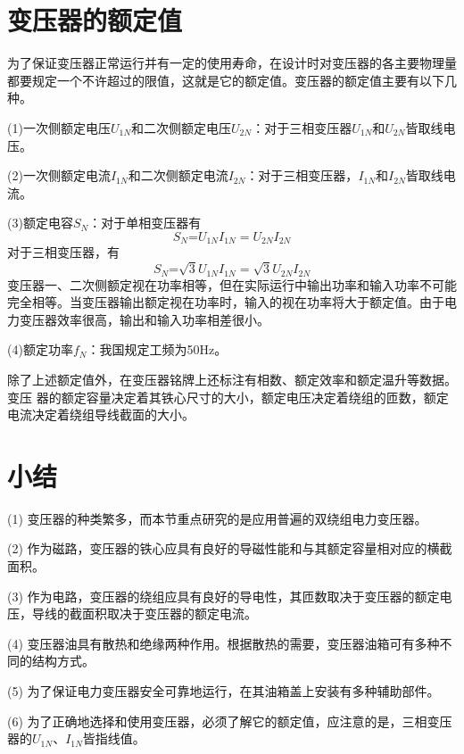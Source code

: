 \documentclass{book}
\begin{document}
\section{变压器的额定值}
为了保证变压器正常运行并有一定的使用寿命，在设计时对变压器的各主要物理量都要规定一个不许超过的限值，这就是它的额定值。变压器的额定值主要有以下几种。

(1)一次侧额定电压${{U}_{1N}}$和二次侧额定电压${{U}_{2N}}$：对于三相变压器${{U}_{1N}}$和${{U}_{2N}}$皆取线电压。

(2)一次侧额定电流${{I}_{1N}}$和二次侧额定电流${{I}_{2N}}$：对于三相变压器，${{I}_{1N}}$和${{I}_{2N}}$皆取线电流。

(3)额定电容${{S}_{N}}$：对于单相变压器有
\begin{equation}
{{S}_{N}}\text{=}{{U}_{1N}}{{I}_{1N}}={{U}_{2N}}{{I}_{2N}}
\label{1-1}
\end{equation}
对于三相变压器，有
\begin{equation}
{{S}_{N}}\text{=}\sqrt{3}{{U}_{1N}}{{I}_{1N}}=\sqrt{3}{{U}_{2N}}{{I}_{2N}}
\label{1-2}
\end{equation}
变压器一、二次侧额定视在功率相等，但在实际运行中输出功率和输入功率不可能完全相等。当变压器输出额定视在功率时，输入的视在功率将大于额定值。由于电力变压器效率很高，输出和输入功率相差很小。

(4)额定功率${{f}_{N}}$：我国规定工频为50Hz。

除了上述额定值外，在变压器铭牌上还标注有相数、额定效率和额定温升等数据。变压 器的额定容量决定着其铁心尺寸的大小，额定电压决定着绕组的匝数，额定电流决定着绕组导线截面的大小。

\section{小结}
(1) 变压器的种类繁多，而本节重点研究的是应用普遍的双绕组电力变压器。

(2) 作为磁路，变压器的铁心应具有良好的导磁性能和与其额定容量相对应的横截面积。

(3) 作为电路，变压器的绕组应具有良好的导电性，其匝数取决于变压器的额定电压，导线的截面积取决于变压器的额定电流。

(4) 变压器油具有散热和绝缘两种作用。根据散热的需要，变压器油箱可有多种不同的结构方式。

(5) 为了保证电力变压器安全可靠地运行，在其油箱盖上安装有多种辅助部件。

(6) 为了正确地选择和使用变压器，必须了解它的额定值，应注意的是，三相变压器的${{U}_{1N}}$、${{I}_{1N}}$皆指线值。
\end{document}
